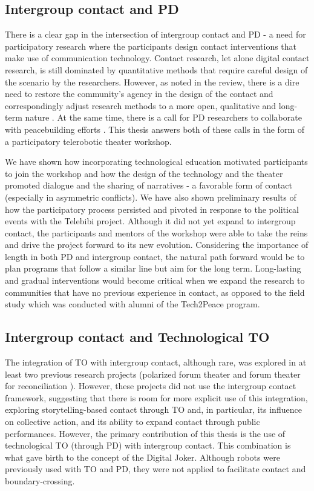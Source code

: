 \documentclass[dissertation,math,vertlayout,pdfa,colorlinks]{aaltoseries}
\begin{document}
\subsection{Intergroup contact and PD}
There is a clear gap in the intersection of intergroup contact and PD - a need for participatory research where the participants design contact interventions that make use of communication technology. Contact research, let alone digital contact research, is still dominated by quantitative methods that require careful design of the scenario by the researchers. However, as noted in the review, there is a dire need to restore the community's agency in the design of the contact and correspondingly adjust research methods to a more open, qualitative and long-term nature \cite{dixonNegativeContactCollective2021}. At the same time, there is a call for PD researchers to collaborate with peacebuilding efforts \cite{bodkerAfterthoughtsEmergentFuture2025}. This thesis answers both of these calls in the form of a participatory telerobotic theater workshop. 

We have shown how incorporating technological education motivated participants to join the workshop and how the design of the technology and the theater promoted dialogue and the sharing of narratives - a favorable form of contact (especially in asymmetric conflicts). We have also shown preliminary results of how the participatory process persisted and pivoted in response to the political events with the Telebibi project. Although it did not yet expand to intergroup contact, the participants and mentors of the workshop were able to take the reins and drive the project forward to its new evolution. Considering the importance of length in both PD and intergroup contact, the natural path forward would be to plan programs that follow a similar line but aim for the long term. Long-lasting and gradual interventions would become critical when we expand the research to communities that have no previous experience in contact, as opposed to the field study which was conducted with alumni of the Tech2Peace program.

\subsection{Intergroup contact and Technological TO}
The integration of TO with intergroup contact, although rare, was explored in at least two previous research projects (polarized forum theater \cite{alonCHAPTERFOURTEENNonViolent2011} and forum theater for reconciliation \cite{miramontiForumTheatreReconciliation2025}). However, these projects did not use the intergroup contact framework, suggesting that there is room for more explicit use of this integration, exploring storytelling-based contact through TO and, in particular, its influence on collective action, and its ability to expand contact through public performances. However, the primary contribution of this thesis is the use of technological TO (through PD) with intergroup contact. This combination is what gave birth to the concept of the Digital Joker. Although robots were previously used with TO and PD, they were not applied to facilitate contact and boundary-crossing.
\end{document}
